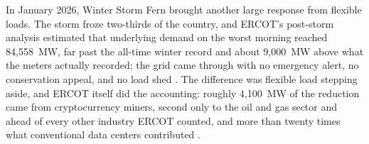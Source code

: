 In January 2026, Winter Storm Fern brought another large response from flexible loads. The storm froze two-thirds of the country, and ERCOT's post-storm analysis estimated that underlying demand on the worst morning reached 84,558~MW, far past the all-time winter record and about 9,000~MW above what the meters actually recorded; the grid came through with no emergency alert, no conservation appeal, and no load shed \autocite{ERCOTMonthlyJan2026}. %
The difference was flexible load stepping aside, and ERCOT itself did the accounting: roughly 4,100~MW of the reduction came from cryptocurrency miners, second only to the oil and gas sector and ahead of every other industry ERCOT counted, and more than twenty times what conventional data centers contributed \autocite{ERCOTMonthlyJan2026}. %
